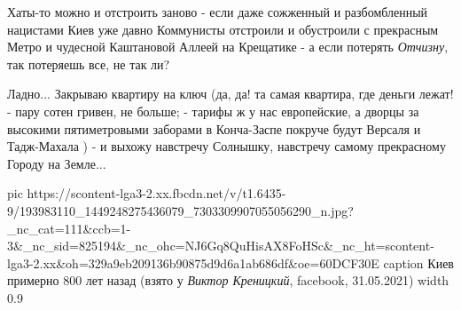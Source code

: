 Хаты-то можно и отстроить заново - если даже сожженный и разбомбленный
нацистами Киев уже давно Коммунисты отстроили и обустроили с прекрасным Метро и
чудесной Каштановой Аллеей на Крещатике - а если потерять \emph{Отчизну}, так
потеряешь все, не так ли?

Ладно... Закрываю квартиру на ключ (да, да! та самая квартира, где деньги
лежат! - пару сотен гривен, не больше; - тарифы ж у нас европейские, а дворцы
за высокими пятиметровыми заборами в Конча-Заспе покруче будут Версаля и
Тадж-Махала ) - и выхожу навстречу Солнышку, навстречу самому прекрасному
Городу на Земле... 

\ifcmt
  pic https://scontent-lga3-2.xx.fbcdn.net/v/t1.6435-9/193983110_1449248275436079_7303309907055056290_n.jpg?_nc_cat=111&ccb=1-3&_nc_sid=825194&_nc_ohc=NJ6Gq8QuHisAX8FoHSc&_nc_ht=scontent-lga3-2.xx&oh=329a9eb209136b90875d9d6a1ab686df&oe=60DCF30E
  caption Киев примерно 800 лет назад (взято у \emph{Виктор Креницкий}, facebook, 31.05.2021)
  width 0.9
\fi
